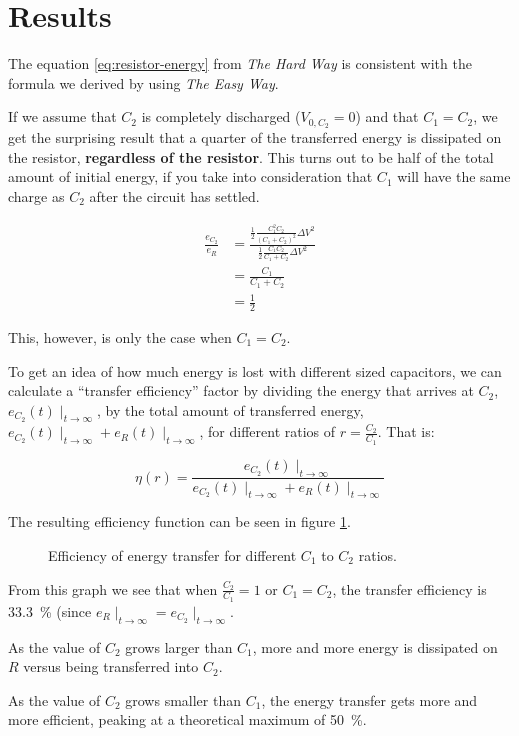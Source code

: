 \section{Results}

The equation \ref{eq:resistor-energy} from \textit{The Hard Way} is consistent with the formula we derived by using \textit{The Easy Way}.

If we assume that $C_2$ is completely discharged ($V_{0,C_2}=0$) and that $C_1=C_2$, we get the surprising result that a quarter of the transferred energy is dissipated on the resistor, \textbf{regardless of the resistor}. This turns out to be half of the total amount of initial energy, if you take into consideration that $C_1$ will have the same charge as $C_2$ after the circuit has settled.

\begin{align}
    \frac{e_{C_2}}{e_R} &= \frac{\frac{1}{2}\frac{C_1^2C_2}{\left(C_1+C_2\right)^2}\Delta V^2}{\frac{1}{2}\frac{C_1C_2}{C_1+C_2}\Delta V^2} \\
                        &= \frac{C_1}{C_1+C_2} \\
                        &= \frac{1}{2}
\end{align}

This, however, is only the case when $C_1=C_2$.

To get an idea of how much energy is lost with different sized capacitors, we can calculate a ``transfer efficiency'' factor by dividing the energy that arrives at $C_2$, $e_{C_2}(t)\mid_{t\to\infty}$, by the total amount of transferred energy, $e_{C_2}(t)\mid_{t\to\infty} + e_R(t)\mid_{t\to\infty}$, for different ratios of $r=\frac{C_2}{C_1}$. That is:

\begin{equation}
    \eta(r) = \frac{e_{C_2}(t)\mid_{t\to\infty}}{e_{C_2}(t)\mid_{t\to\infty} + e_R(t)\mid_{t\to\infty}}
\end{equation}

The resulting efficiency function can be seen in figure \ref{fig:transfer-efficiency}.

\begin{figure}[t]
    \centering
    
    \caption{Efficiency of energy transfer for different $C_1$ to $C_2$ ratios.}
    \label{fig:transfer-efficiency}
\end{figure}

From this graph we see that when $\frac{C_2}{C_1}=1$ or $C_1=C_2$, the transfer efficiency is \SI{33.3}{\percent} (since $e_R\mid_{t\to\infty} = e_{C_2}\mid_{t\to\infty}$.

As the value of $C_2$ grows larger than $C_1$, more and more energy is dissipated on $R$ versus being transferred into $C_2$.

As the value of $C_2$ grows smaller than $C_1$, the energy transfer gets more and more efficient, peaking at a theoretical maximum of \SI{50}{\percent}.

